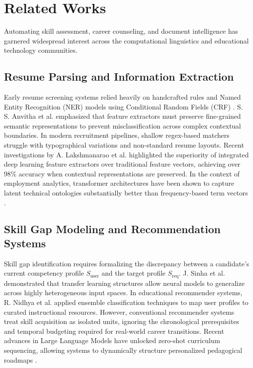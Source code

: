 \documentclass[conference]{IEEEtran}
\begin{document}
\section{Related Works}
Automating skill assessment, career counseling, and document intelligence has garnered widespread interest across the computational linguistics and educational technology communities.

\subsection{Resume Parsing and Information Extraction}
Early resume screening systems relied heavily on handcrafted rules and Named Entity Recognition (NER) models using Conditional Random Fields (CRF) \cite{salian2023mpinet}. S. S. Anvitha et al. \cite{anvitha2024fine} emphasized that feature extractors must preserve fine-grained semantic representations to prevent misclassification across complex contextual boundaries. In modern recruitment pipelines, shallow regex-based matchers struggle with typographical variations and non-standard resume layouts. Recent investigations by A. Lakshmanarao et al. \cite{lakshmanarao2024medicinal} highlighted the superiority of integrated deep learning feature extractors over traditional feature vectors, achieving over 98\% accuracy when contextual representations are preserved. In the context of employment analytics, transformer architectures have been shown to capture latent technical ontologies substantially better than frequency-based term vectors \cite{tiwari2024medleafnet}.

\subsection{Skill Gap Modeling and Recommendation Systems}
Skill gap identification requires formalizing the discrepancy between a candidate's current competency profile $S_{\text{user}}$ and the target profile $S_{\text{req}}$. J. Sinha et al. \cite{sinha2024ayurvedic} demonstrated that transfer learning structures allow neural models to generalize across highly heterogeneous input spaces. In educational recommender systems, R. Nidhya et al. \cite{nidhya2024real} applied ensemble classification techniques to map user profiles to curated instructional resources. However, conventional recommender systems treat skill acquisition as isolated units, ignoring the chronological prerequisites and temporal budgeting required for real-world career transitions. Recent advances in Large Language Models have unlocked zero-shot curriculum sequencing, allowing systems to dynamically structure personalized pedagogical roadmaps \cite{islam2024medicinal}.
\end{document}
